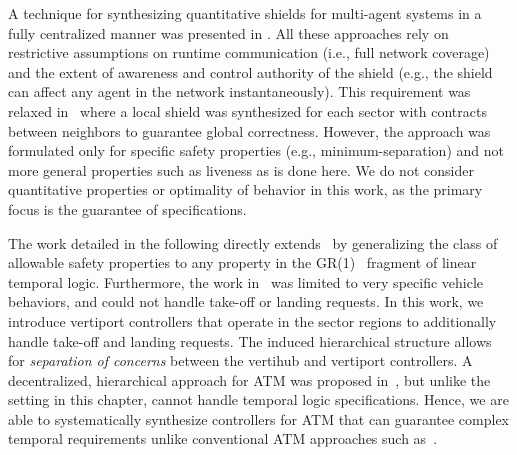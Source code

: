 A technique for synthesizing quantitative shields for multi-agent systems in a fully centralized manner was presented in \cite{multiagentshield}. All these approaches rely on restrictive assumptions on runtime communication (i.e., full network coverage) and the extent of awareness and control authority of the shield (e.g., the shield can affect any agent in the network instantaneously). This requirement was relaxed in~\cite{bhnfm} where a local shield was synthesized for each sector with contracts between neighbors to guarantee global correctness. However, the approach was formulated only for specific safety properties (e.g., minimum-separation) and not more general properties such as liveness as is done here. We do not consider quantitative properties or optimality of behavior in this work, as the primary focus is the guarantee of specifications.

The work detailed in the following directly extends~\cite{bhnfm} by generalizing the class of allowable safety properties to any property in the GR(1)~\cite{bloem2012} fragment of linear temporal logic. Furthermore, the work in~\cite{bhnfm} was limited to very specific vehicle behaviors, and could not handle take-off or landing requests. In this work, we introduce vertiport controllers that operate in the sector regions to additionally handle take-off and landing requests. The induced hierarchical structure allows for \emph{separation of concerns} between the vertihub and vertiport controllers. A decentralized, hierarchical approach for ATM was proposed in~\cite{6011668}, but unlike the setting in this chapter, cannot handle temporal logic specifications. Hence, we are able to systematically synthesize controllers for ATM that can guarantee complex temporal requirements unlike conventional ATM approaches such as~\cite{6011668}. 

